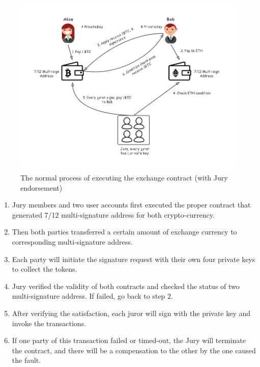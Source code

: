 \begin{figure}[H]
    \includegraphics[width=1\textwidth]{./figures/jury.png}
    \centering
    \caption{The normal process of executing the exchange contract (with Jury endorsement) \protect\footnotemark}
    \label{fig:jury}
    \centering
\end{figure}
\begin{enumerate}
    \item Jury members and two user accounts first executed the proper contract that generated 7/12 multi-signature address for both crypto-currency.
    \item Then both parties transferred a certain amount of exchange currency to corresponding multi-signature address.
    \item Each party will initiate the signature request with their own four private keys to collect the tokens.
    \item Jury verified the validity of both contracts and checked the status of two multi-signature address. If failed, go back to step 2.
    \item After verifying the satisfaction, each juror will sign with the private key and invoke the transactions.
    \item If one party of this transaction failed or timed-out, the Jury will terminate the contract, and there will be a compensation to the other by the one caused the fault.
\end{enumerate}
